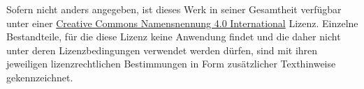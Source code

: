 \documentclass[paper=a4,11pt,twoside,parskip=half-]{scrreprt} %
\begin{document}
\small  Sofern nicht anders angegeben, ist dieses Werk in seiner Gesamtheit verfügbar unter einer \href{https://creativecommons.org/licenses/by/4.0/}{\foreignlanguage{english}{Creative Commons} Namensnennung 4.0 International} Lizenz. %
Einzelne Bestandteile, für die diese Lizenz keine Anwendung findet und die daher nicht unter deren Lizenzbedingungen verwendet werden dürfen, sind mit ihren jeweiligen lizenzrechtlichen Bestimmungen in Form zusätzlicher Texthinweise gekennzeichnet. 
\end{document}
